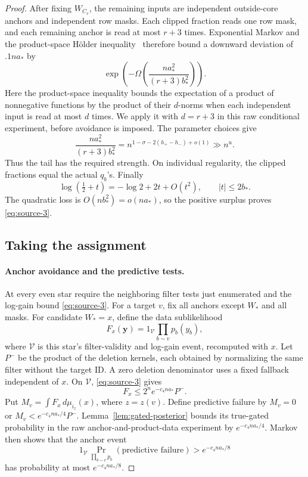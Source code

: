\begin{proof}
After fixing \(W_{C_v}\), the remaining inputs are independent outside-core anchors and independent row masks. Each clipped fraction reads one row mask, and each remaining anchor is read at most \(r+3\) times. Exponential Markov and the product-space H\"older inequality~\cite{finner1992} therefore bound a downward deviation of \(.1na_*\) by
\[
 \exp\!\left(-\Omega\!\left(\frac{na_*^2}{(r+3)b_*^2}\right)\right).
\]
Here the product-space inequality bounds the expectation of a product of nonnegative functions by the product of their \(d\)-norms when each independent input is read at most \(d\) times. We apply it with \(d=r+3\) in this raw conditional experiment, before avoidance is imposed. The parameter choices give
\[
 \frac{na_*^2}{(r+3)b_*^2}
      =n^{1-\sigma-2(h_+-h_-)+o(1)}\gg n^u.
\]
Thus the tail has the required strength. On individual regularity, the clipped fractions equal the actual \(q_b\)'s. Finally
\[
 \log(\tfrac12+t)=-\log2+2t+O(t^2),\qquad |t|\le2b_*.
\]
The quadratic loss is \(O(nb_*^2)=o(na_*)\), so the positive surplus proves \eqref{eq:source-3}.

\subsection{Taking the assignment}
\label{sec:taking-the-assignment-intermediate}

\paragraph{Anchor avoidance and the predictive tests.}
At every even star require the neighboring filter tests just enumerated and the log-gain bound \eqref{eq:source-3}. For a target \(v\), fix all anchors except \(W_*\) and all masks. For candidate \(W_*=x\), define the data sublikelihood
\[
 F_x(\mathbf y)=1_{\mathcal V}\prod_{b\sim v}p_b(y_b),
\]
where \(\mathcal V\) is this star's filter-validity and log-gain event, recomputed with \(x\). Let \(P^-\) be the product of the deletion kernels, each obtained by normalizing the same filter without the target ID. A zero deletion denominator uses a fixed fallback independent of \(x\). On \(\mathcal V\), \eqref{eq:source-3} gives
\[
 F_x\le2^n e^{-c_4na_*}P^-.
\]
Put \(M_v=\int F_x\,d\mu_{i_z}(x)\), where \(z=z(v)\). Define predictive failure by
\(M_v=0\) or \(M_v<e^{-c_4na_*/4}P^-\).
Lemma~\ref{lem:gated-posterior} bounds its true-gated probability in the raw anchor-and-product-data experiment by \(e^{-c_4na_*/4}\). Markov then shows that the anchor event
\[
 1_{\mathcal V}\Pr_{\prod_{b\sim v}p_b}
          (\text{predictive failure})>e^{-c_4na_*/8}
\]
has probability at most \(e^{-c_4na_*/8}\).


\end{proof}
